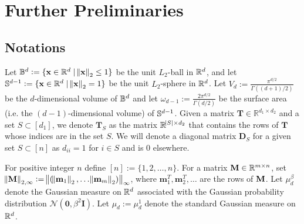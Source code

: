 \section{Further Preliminaries}\label{sec:further_prelims}
\subsection{Notations}
Let $\mathbb{B}^d := \{\mathbf{x} \in \mathbb{R}^d \mid \norm{\mathbf{x}}_2 \leq 1\}$ be the unit $L_2$-ball in $\mathbb{R}^d$, and let
$\mathbb{S}^{d-1} := \{\mathbf{x} \in \mathbb{R}^d \mid \norm{\mathbf{x}}_2 = 1\}$ be the unit $L_2$-sphere in $\mathbb{R}^d$. Let $V_d := \frac{\pi^{d/2}}{\Gamma((d+1)/2)}$ 
be the $d$-dimensional volume of $\mathbb{B}^d$ and let $\omega_{d-1} := \frac{2\pi^{d/2}}{\Gamma(d/2)}$ be the surface area (i.e. the $(d-1)$-dimensional volume) of $\mathbb{S}^{d-1}$. Given a matrix $\mathbf{T} \in \mathbb{R}^{d_1 \times d_2}$ and a set $S \subset [d_1]$, we denote $\mathbf{T}_{S}$ as the matrix $\mathbb{R}^{\abs{S} \times d_2}$ that contains the rows of $\mathbf{T}$ whose indices are in the set $S$. We will denote a diagonal matrix $\mathbf{D}_{S}$ for a given set $S \subset [n]$ as $d_{ii} = 1$ for $i \in S$ and is $0$ elsewhere.


For positive integer $n$ define $[n]:=\{1, 2, \ldots, n\}$. For a matrix $\mathbf{M} \in \mathbb{R}^{m\times n}$, set
$\norm{\mathbf{M}}_{2, \infty} := \norm{(\norm{\mathbf{m}_1}_2, \ldots \norm{\mathbf{m}_m}_2)}_\infty$, where $\mathbf{m}_1^T, \mathbf{m}_2^T, \ldots$ are the rows of $\mathbf{M}$. 
Let $\mu_d^{\beta}$ denote the Gaussian measure on $\mathbb{R}^d$ associated with the Gaussian probability distribution $\mathcal{N}(\mathbf{0},  \beta^2\mathbf{I})$.
Let $\mu_d := \mu_d^{1}$ denote the standard Gaussian measure on $\mathbb{R}^d$.

